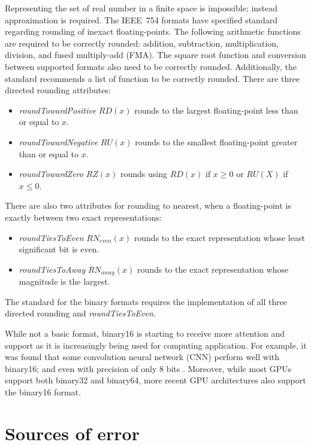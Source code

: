 Representing the set of real number in a finite space is impossible; instead approximation is required.
The IEEE~754 formats have specified standard regarding rounding of inexact floating-points.
The following arithmetic functions are required to be correctly rounded: addition, subtraction, multiplication, division, and fused multiply-add (FMA).
The square root function and conversion between supported formats also need to be correctly rounded.
Additionally, the standard recommends a list of function to be correctly rounded. %
There are three directed rounding attributes:
\begin{itemize}
	\item \textit{roundTowardPositive} $RD(x)$ rounds to the largest floating-point less than or equal to $x$.
	\item \textit{roundTowardNegative} $RU(x)$ rounds to the smallest floating-point greater than or equal to $x$.
	\item \textit{roundTowardZero} $RZ(x)$ rounds using $RD(x)$ if $x \ge 0$ or $RU(X)$ if $x \le 0$.
\end{itemize}
There are also two attributes for rounding to nearest, when a floating-point is exactly between two exact representations:
\begin{itemize}
	\item \textit{roundTiesToEven} $RN_{even}(x)$ rounds to the exact representation whose least significant bit is even.
	\item \textit{roundTiesToAway} $RN_{away}(x)$ rounds to the exact representation whose magnitude is the largest.
\end{itemize}
The standard for the binary formats requires the implementation of all three directed rounding and \textit{roundTiesToEven}.

While not a basic format, binary16 is starting to receive more attention and support as it is increasingly being used for computing application.
For example, it was found that some convolution neural network (CNN) perform well with binary16; and even with precision of only 8 bits .
Moreover, while most GPUs support both binary32 and binary64, more recent GPU architectures also support the binary16 format.

\section{Sources of error}
\begin{comment}
- rounding
- double rounding
- cancellation
- overflow & underflow
- accumulation
- swamping

\end{comment}
